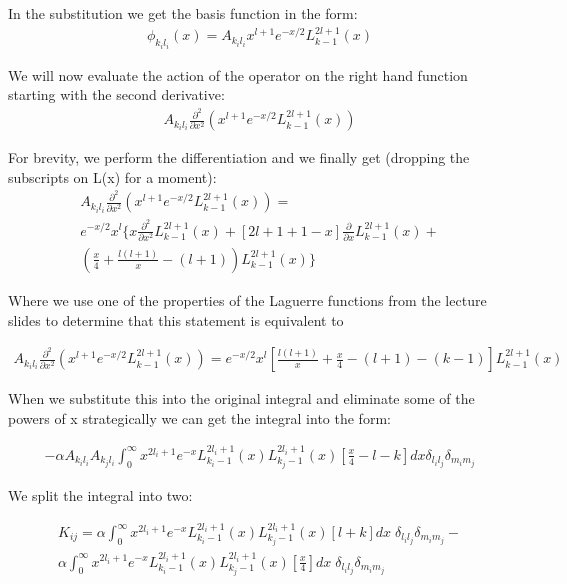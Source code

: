 \documentclass{article}
\begin{document}
    In the substitution we get the basis function in the form:
    \large
    \begin{gather}
    	\phi_{k_il_i}(x) = A_{k_il_i} x^{l+1} e^{-x/2} L^{2l+1}_{k-1}(x)
    \end{gather}   
    \normalsize
    
    We will now evaluate the action of the operator on the right hand function starting with the second derivative:
    \large
    \begin{gather}
    	A_{k_il_i} \frac{\partial^2}{\partial x^2}(x^{l+1} e^{-x/2} L^{2l+1}_{k-1}(x))
    \end{gather}   
    \normalsize
    
    For brevity, we perform the differentiation and we finally get (dropping the subscripts on L(x) for a moment):
    \large
    \begin{gather}
    	A_{k_il_i} \frac{\partial^2}{\partial x^2}(x^{l+1} e^{-x/2} L^{2l+1}_{k-1}(x)) = \\
    	e^{-x/2}x^l \{x\frac{\partial^2}{\partial x^2}L^{2l+1}_{k-1}(x) + [2l+1+1-x]\frac{\partial}{\partial x}L^{2l+1}_{k-1}(x) +\\
    	 (\frac{x}{4} + \frac{l(l+1)}{x} -(l+1))L^{2l+1}_{k-1}(x)  \}
    \end{gather}
    \normalsize
    
    Where we use one of the properties of the Laguerre functions from the lecture slides to determine that this statement is equivalent to
    
    \large
    \begin{gather}
    	A_{k_il_i} \frac{\partial^2}{\partial x^2}(x^{l+1} e^{-x/2} L^{2l+1}_{k-1}(x)) = 
    	e^{-x/2}x^l \left[ \frac{l(l+1)}{x} + \frac{x}{4} - (l+1) - (k-1) \right] L^{2l+1}_{k-1}(x)
    \end{gather}
    \normalsize
    
    When we substitute this into the original integral and eliminate some of the powers of x strategically we can get the integral into the form:
    
    \large
    \begin{gather}
    	-\alpha A_{k_il_i} A_{k_jl_i}\int_{0}^{\infty}x^{2l_i+1}e^{-x}L^{2l_i+1}_{k_i-1}(x)L^{2l_i+1}_{k_j-1}(x)\left[\frac{x}{4} - l - k \right]dx \delta_{l_il_j} \delta_{m_im_j}
    \end{gather}
    \normalsize
    
    We split the integral into two:
    
    \large
    \begin{gather}
    	K_{ij} = \alpha \int_{0}^{\infty}x^{2l_i+1}e^{-x}L^{2l_i+1}_{k_i-1}(x)L^{2l_i+1}_{k_j-1}(x)\left[l + k\right]dx \; \delta_{l_il_j} \delta_{m_im_j}- \\
    	\alpha \int_{0}^{\infty}x^{2l_i+1}e^{-x}L^{2l_i+1}_{k_i-1}(x)L^{2l_i+1}_{k_j-1}(x)\left[\frac{x}{4}\right]dx\; \delta_{l_il_j} \delta_{m_im_j}
    \end{gather}
    \normalsize
    
\end{document}
